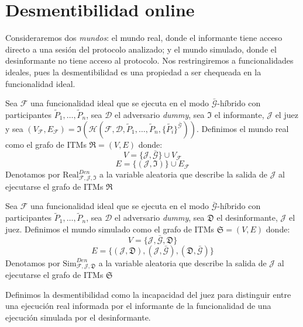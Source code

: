 \section{Desmentibilidad online}

Consideraremos dos \textit{mundos}: el mundo real, donde el informante tiene acceso directo a una sesión
del protocolo analizado; y el mundo simulado, donde el desinformante no tiene acceso al protocolo.
Nos restringiremos a funcionalidades ideales, pues la desmentibilidad es una propiedad a ser chequeada en la
funcionalidad ideal.

\begin{definicion}
Sea $\mathcal{F}$ una funcionalidad ideal que se ejecuta en el modo $\bar{\mathcal{G}}$-híbrido con participantes
$\tilde{P}_1, \ldots, \tilde{P}_n$, sea $\mathcal{D}$ el adversario \textit{dummy}, sea $\mathfrak{I}$ el
informante, $\mathcal{J}$ el juez y sea
$(V_\mathcal{F}, E_\mathcal{F}) =
\mathfrak{I}(
    \mathcal{H}(
        \mathcal{F},
        \mathcal{D},
        \tilde{P}_1,
        \ldots,
        \tilde{P}_n,
        \{\tilde{P_i}\}^{\bar{\mathcal{G}}}))$.
Definimos el mundo real como el grafo de ITMs $\mathfrak{R} = (V, E)$ donde:
$$V = \{\mathcal{J}, \bar{\mathcal{G}}\} \cup V_\mathcal{F}$$
$$E = \{(\mathcal{J}, \mathfrak{I})\} \cup E_\mathcal{F}$$
Denotamos por $\mathrm{Real}_{\mathcal{F}, \mathcal{J}, \mathfrak{I}}^{Den}$ a la variable aleatoria
que describe la salida de $\mathcal{J}$ al ejecutarse el grafo de ITMs $\mathfrak{R}$
\end{definicion}

\begin{definicion}
Sea $\mathcal{F}$ una funcionalidad ideal que se ejecuta en el modo $\bar{\mathcal{G}}$-híbrido con participantes
$\tilde{P}_1, \ldots, \tilde{P}_n$, sea $\mathcal{D}$ el adversario \textit{dummy}, sea $\mathfrak{D}$ el
desinformante, $\mathcal{J}$ el juez.
Definimos el mundo simulado como el grafo de ITMs $\mathfrak{S} = (V, E)$ donde:
$$V = \{\mathcal{J}, \bar{\mathcal{G}}, \mathfrak{D}\}$$
$$E = \{(\mathcal{J}, \mathfrak{D}),
        (\mathcal{J}, \bar{\mathcal{G}}),
        (\mathfrak{D}, \bar{\mathcal{G}})\}$$
Denotamos por $\mathrm{Sim}_{\mathcal{F}, \mathcal{J}, \mathfrak{D}}^{Den}$ a la variable aleatoria
que describe la salida de $\mathcal{J}$ al ejecutarse el grafo de ITMs $\mathfrak{S}$
\end{definicion}

Definimos la desmentibilidad como la incapacidad del juez para distinguir entre una ejecución
real informada por el informante de la funcionalidad de una ejecución simulada por el desinformante.

